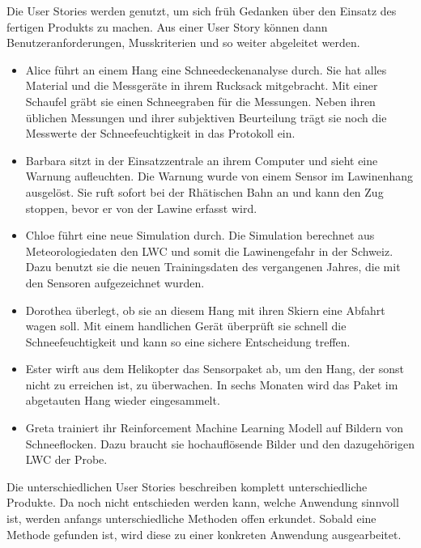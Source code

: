 

Die User Stories werden genutzt, um sich früh Gedanken über den Einsatz des fertigen Produkts zu machen. Aus einer User Story können dann Benutzeranforderungen, Musskriterien und so weiter abgeleitet werden.

\begin{itemize}

\item Alice führt an einem Hang eine Schneedeckenanalyse durch. Sie hat alles Material und die Messgeräte in ihrem Rucksack mitgebracht. Mit einer Schaufel gräbt sie einen Schneegraben für die Messungen. Neben ihren üblichen Messungen und ihrer subjektiven Beurteilung trägt sie noch die Messwerte der Schneefeuchtigkeit in das Protokoll ein.

\item Barbara sitzt in der Einsatzzentrale an ihrem Computer und sieht eine Warnung aufleuchten. Die Warnung wurde von einem Sensor im Lawinenhang ausgelöst. Sie ruft sofort bei der Rhätischen Bahn an und kann den Zug stoppen, bevor er von der Lawine erfasst wird.

\item Chloe führt eine neue Simulation durch. Die Simulation berechnet aus Meteorologiedaten den LWC und somit die Lawinengefahr in der Schweiz. Dazu benutzt sie die neuen Trainingsdaten des vergangenen Jahres, die mit den Sensoren aufgezeichnet wurden.

\item Dorothea überlegt, ob sie an diesem Hang mit ihren Skiern eine Abfahrt wagen soll. Mit einem handlichen Gerät überprüft sie schnell die Schneefeuchtigkeit und kann so eine sichere Entscheidung treffen.

\item Ester wirft aus dem Helikopter das Sensorpaket ab, um den Hang, der sonst nicht zu erreichen ist, zu überwachen. In sechs Monaten wird das Paket im abgetauten Hang wieder eingesammelt.

\item Greta trainiert ihr Reinforcement Machine Learning Modell auf Bildern von Schneeflocken. Dazu braucht sie hochauflösende Bilder und den dazugehörigen LWC der Probe.

\end{itemize}

Die unterschiedlichen User Stories beschreiben komplett unterschiedliche Produkte. Da noch nicht entschieden werden kann, welche Anwendung sinnvoll ist, werden anfangs unterschiedliche Methoden offen erkundet. Sobald eine Methode gefunden ist, wird diese zu einer konkreten Anwendung ausgearbeitet.

